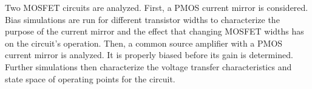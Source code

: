 Two MOSFET circuits are analyzed. First, a PMOS current mirror is considered. Bias simulations are run for different transistor widths to characterize the purpose of the current mirror and the effect that changing MOSFET widths has on the circuit's operation. Then, a common source amplifier with a PMOS current mirror is analyzed. It is properly biased before its gain is determined. Further simulations then characterize the voltage transfer characteristics and state space of operating points for the circuit.
